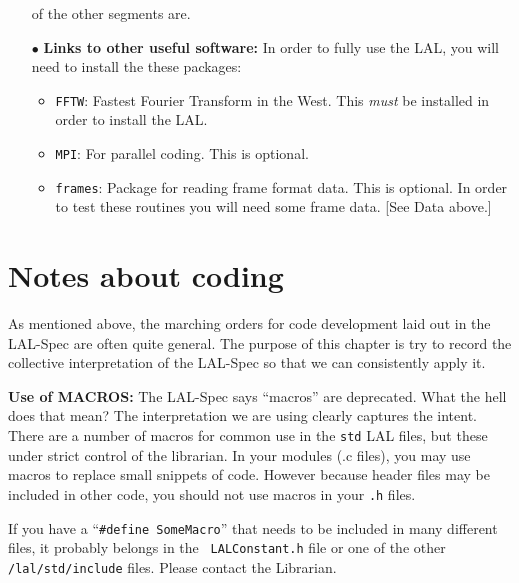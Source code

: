 \documentclass[oneside]{book}
\begin{document}
\begin{itemize}
                      of the other segments are.
    \vspace*{-0.051in}
    \item[$\bullet$ ] {\bf Links to other useful software:} In order to
                      fully use the LAL, you will need to install the
                      these packages:
    \begin{itemize}
          \vspace*{-0.051in}
          \item {\texttt {FFTW}}:  Fastest Fourier Transform in the West.
          This {\it must} be installed in order to install the LAL.
          \vspace*{-0.051in}
          \item {\texttt {MPI}}:  For parallel coding. This is
          optional.
          \vspace*{-0.051in}
          \item {\texttt {frames}}: Package for reading frame format data.
          This is optional.
          In order to test these routines you will need some frame
          data. [See Data above.]
    \end{itemize}
\end{itemize}

\chapter{Notes about coding}
\label{c:CodingNotes}

As mentioned above,  the marching orders for code development laid out
in the LAL-Spec are often quite general.  The purpose of this chapter
is try to record the collective interpretation of the LAL-Spec so that
we can consistently apply it.

\bigskip

{\noindent \bf Use of MACROS:} The LAL-Spec says ``macros'' are
deprecated.  What the hell does that mean? The interpretation we are
using clearly captures the intent.  There are a number of macros for
common use in the {\tt std} LAL files, but these under strict control
of the librarian.  In your modules (.c files), you may use macros to
replace small snippets of code.  However because header files may be
included in other code, you should not use macros in your {\tt .h}
files.

If you have a ``{\texttt {\#define SomeMacro}}'' that needs to be
included in many different files, it probably belongs in the {\tt
LALConstant.h} file or one of the other {\tt /lal/std/include} files.
Please contact the Librarian.
\end{document}
